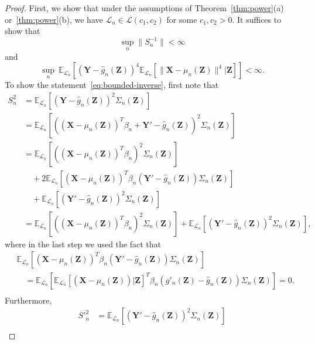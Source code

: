 \documentclass[12pt]{article}
\theoremstyle{definition}
\theoremstyle{remark}
\newcommand{\prx}{\bm X}
\newcommand{\prz}{\bm Z}
\newcommand{\pry}{{\bm Y}}
\begin{document}
\begin{proof}
First, we show that under the assumptions of Theorem~\ref{thm:power}(a) or~\ref{thm:power}(b), we have $\mathcal L_n \in \mathscr L(c_1, c_2)$ for some $c_1, c_2 > 0$. It suffices to show that
\begin{equation}
\sup_{n} \|S_n^{-1}\| < \infty
\label{eq:bounded-inverse}
\end{equation}
and
\begin{equation}
\sup_n\ \mathbb E_{\mathcal L_n}\left[(\pry - \widehat g_n(\prz))^{4} \mathbb E_{\mathcal L_n}[\|\prx - \mu_n(\prz)\|^{4}|\prz]\right] < \infty.
\label{eq:bounded-eighth-moment}
\end{equation}
To show the statement~\eqref{eq:bounded-inverse}, first note that
\begin{equation}
	\begin{split}
		S_n^2 &= \mathbb E_{\mathcal L_n}[(\pry - \widehat g_n(\prz))^2 \Sigma_n(\prz)] \\
		&=   \mathbb E_{\mathcal L_n}[((\prx - \mu_n(\prz))^T \beta_n + \pry'-\widehat g_n(\prz))^2 \Sigma_n(\prz)] \\
		&= \mathbb E_{\mathcal L_n}[((\prx - \mu_n(\prz))^T \beta_n)^2\Sigma_n(\prz)]  \\
		&\quad+2\mathbb E_{\mathcal L_n}[(\prx - \mu_n(\prz))^T \beta_n( \pry'-\widehat g_n(\prz))\Sigma_n(\prz)] \\
		&\quad + \mathbb E_{\mathcal L_n}[( \pry'-\widehat g_n(\prz))^2 \Sigma_n(\prz)] \\
		&= \mathbb E_{\mathcal L_n}[((\prx - \mu_n(\prz))^T \beta_n)^2\Sigma_n(\prz)] + \mathbb E_{\mathcal L_n}[(\pry'-\widehat g_n(\prz))^2 \Sigma_n(\prz)],
		\label{eq:s-n-2}
	\end{split}
\end{equation}
where in the last step we used the fact that
\begin{equation*}
	\begin{split}
		&\mathbb E_{\mathcal L_n}[(\prx - \mu_n(\prz))^T \beta_n( \pry'-\widehat g_n(\prz))\Sigma_n(\prz)] \\
		&\quad=\mathbb E_{\mathcal L_n}[\mathbb E_{\mathcal L_n}[(\prx - \mu_n(\prz))|\prz]^T \beta_n( g'_n(\prz)-\widehat g_n(\prz))\Sigma_n(\prz)] = 0. \\
	\end{split}
\end{equation*}
Furthermore, 
\begin{equation}
	\begin{split}
		S'^2_n &= \mathbb E_{\mathcal L_n}[(\pry'-\widehat g_n(\prz))^2 \Sigma_n(\prz)] \\

\end{split}
\end{equation}
\end{proof}
\end{document}
